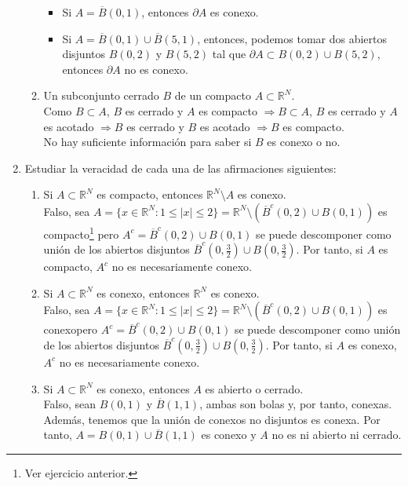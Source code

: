 \documentclass[a4paper, 11pt]{article} %
\begin{document}
\begin{enumerate}
\begin{enumerate}[label=\alph*)]
		\begin{itemize}
			\item Si $A = \overline{B}(0, 1)$, entonces $\partial A$ es conexo.
			\item Si $A = \overline{B}(0, 1) \cup \overline{B}(5, 1)$, entonces, podemos tomar dos abiertos disjuntos $B(0,2)$ y $B(5,2)$ tal que $\partial A \subset B(0,2) \cup B(5,2)$, entonces $\partial A$ no es conexo.
		\end{itemize}
		\item Un subconjunto cerrado $B$ de un compacto $A \subset \mathbb{R}^N$.\\
		Como $B \subset A$, $B$ es cerrado y $A$ es compacto $\Rightarrow B \subset A$, $B$ es cerrado y $A$ es acotado $\Rightarrow B$ es cerrado y $B$ es acotado $\Rightarrow B$ es compacto.\\
		No hay suficiente información para saber si $B$ es conexo o no.
	\end{enumerate}
	\item Estudiar la veracidad de cada una de las afirmaciones siguientes:
	\begin{enumerate}[label=\alph*)]
		\item Si $A \subset \mathbb{R}^N$ es compacto, entonces $\mathbb{R}^N \setminus A$ es conexo.\\
		Falso, sea $A=\{x \in \mathbb{R}^N: 1 \le |x| \le 2\} = \mathbb{R}^N \setminus (\overline{B}^c(0,2) \cup B(0,1))$ es compacto\footnote{Ver ejercicio anterior.} pero $A^c=\overline{B}^c(0,2) \cup B(0,1)$ se puede descomponer como unión de los abiertos disjuntos $\overline{B}^c\left(0,\frac{3}{2}\right) \cup B\left(0,\frac{3}{2}\right)$. Por tanto, si $A$ es compacto, $A^c$ no es necesariamente conexo.
		\item Si $A \subset \mathbb{R}^N$ es conexo, entonces $\mathbb{R}^N$ es conexo.\\
		Falso, sea $A=\{x \in \mathbb{R}^N: 1 \le |x| \le 2\} = \mathbb{R}^N \setminus (\overline{B}^c(0,2) \cup B(0,1))$ es conexo\footnotemark[5] pero $A^c=\overline{B}^c(0,2) \cup B(0,1)$ se puede descomponer como unión de los abiertos disjuntos $\overline{B}^c\left(0,\frac{3}{2}\right) \cup B\left(0,\frac{3}{2}\right)$. Por tanto, si $A$ es conexo, $A^c$ no es necesariamente conexo.
		\item Si $A \subset \mathbb{R}^N$ es conexo, entonces $A$ es abierto o cerrado.\\
		Falso, sean $B(0,1)$ y $\overline{B}(1,1)$, ambas son bolas y, por tanto, conexas. Además, tenemos que la unión de conexos no disjuntos es conexa. Por tanto, $A = B(0,1) \cup \overline{B}(1,1)$ es conexo y $A$ no es ni abierto ni cerrado.

\end{enumerate}
\end{enumerate}
\end{document}
